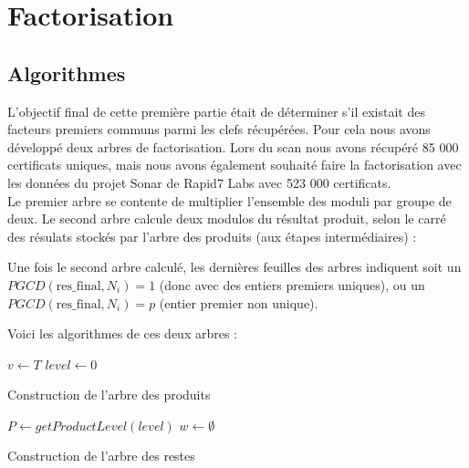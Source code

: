 \section{Factorisation}

\subsection{Algorithmes}

L'objectif final de cette première partie était de déterminer s'il existait des facteurs premiers communs parmi les clefs récupérées. Pour cela nous avons développé deux arbres de factorisation.
Lors du scan nous avons récupéré 85 000 certificats uniques, mais nous avons également souhaité faire la factorisation avec les données du projet Sonar de Rapid7 Labs avec 523 000 certificats.\\


Le premier arbre se contente de multiplier l'ensemble des moduli par groupe de deux.
Le second arbre calcule deux modulos du résultat produit, selon le carré des résulats stockés par l'arbre des produits (aux étapes intermédiaires) :

Une fois le second arbre calculé, les dernières feuilles des arbres indiquent soit un $PGCD(\text{res\_final}, N_i ) = 1$ (donc avec des entiers premiers uniques), ou un $PGCD(\text{res\_final}, N_i ) = p$ (entier premier non unique).

Voici les algorithmes de ces deux arbres :

\begin{algorithm}[H]
\label{alg:productTree}
 $v \leftarrow T$\;
 $level \leftarrow 0$\;
 \caption{Construction de l'arbre des produits} 
\end{algorithm}
\vspace{0.7cm}



\begin{algorithm}[H]
 \label{alg:remainderTree}
 $P \leftarrow getProductLevel(level)$\;
 $w \leftarrow \emptyset$\;
 \caption{Construction de l'arbre des restes}
\end{algorithm}
\vspace{0.7cm}


